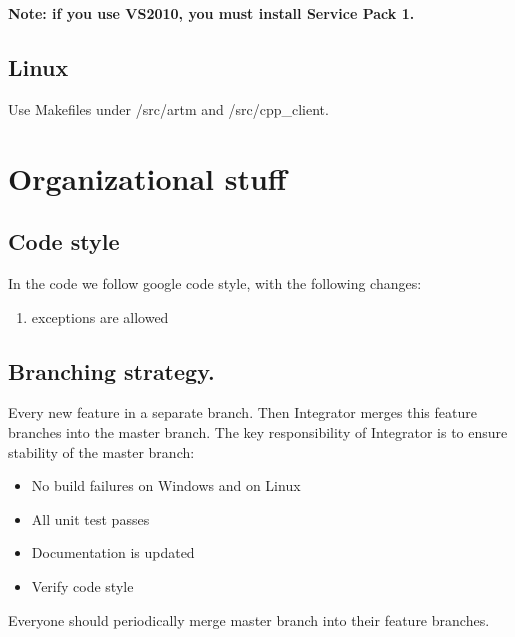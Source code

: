 \documentclass[11pt,a4paper,twoside]{report}
\begin{document}
{\bf Note: if you use VS2010, you must install Service Pack 1.}

\subsection{Linux}

Use Makefiles under /src/artm and /src/cpp\_client.

\section{Organizational stuff}

\subsection{Code style}
In the code we follow google code style, with the following changes:
\begin{enumerate}
    \item exceptions are allowed
\end{enumerate}

\subsection{Branching strategy.}
Every new feature in a separate branch.
Then Integrator merges this feature branches into the master branch.
The key responsibility of Integrator is to ensure stability of the master branch:
\begin{itemize}
    \item No build failures on Windows and on Linux
    \item All unit test passes
    \item Documentation is updated
    \item Verify code style
\end{itemize}
Everyone should periodically merge master branch into their feature branches.
\end{document}
